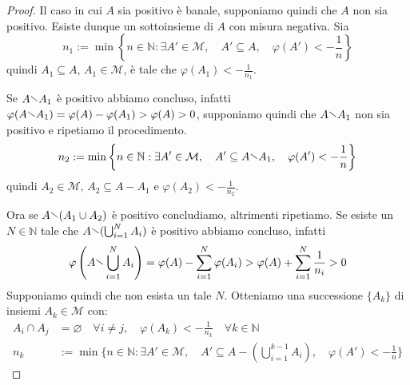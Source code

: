 \begin{proof}
    Il caso in cui \(A\) sia positivo è banale, supponiamo quindi che \(A\) non sia
    positivo. Esiste dunque un sottoinsieme di \(A\) con misura negativa. Sia
    \[
        n_{1} := \min \left\{n \in \mathbb{N} : \exists A' \in \mathcal{M}, \quad A'
        \subseteq A, \quad \varphi(A') < - \frac{1}{n} \right\} 
    \]
    quindi \(A_{1} \subseteq A \), \(A_{1} \in \mathcal{M}\), è tale
    che \(\varphi(A_{1}) < -\frac{1}{n_{1}}\).

    Se \(A\sminus A_{1}\) è positivo abbiamo concluso, infatti \(\varphi(A \sminus
    A_{1}) = \varphi(A) - \varphi(A_{1}) > \varphi(A)>0\), supponiamo quindi che
    \(A \sminus A_{1}\) non sia positivo e ripetiamo il procedimento.
    \[
        n_{2} := \min \left\{n \in \mathbb{N}: \exists A' \in \mathcal{M}, \quad A'
        \subseteq A \sminus A_{1}, \quad \varphi(A') < -\frac{1}{n} \right\} 
    \]
    quindi \(A_{2} \in \mathcal{M}\), \(A_{2} \subseteq A - A_{1} \) e
    \(\varphi(A_{2}) < -\frac{1}{n_{2}}\).

    Ora se \(A \sminus (A_{1} \cup A_{2})\) è positivo concludiamo, altrimenti
    ripetiamo.
    Se esiste un \(N \in \mathbb{N}\) tale che \(A \sminus (\bigcup_{i=1}^{N}
    A_{i} )\) è positivo abbiamo concluso, infatti
    \[
        \varphi\left(A \sminus \bigcup_{i=1}^{N} A_{i}\right) = \varphi(A) - \sum_{i=1}^{N}
        \varphi(A_{i}) > \varphi(A) + \sum_{i=1}^{N} \frac{1}{n_{i}} > 0
    \]
    Supponiamo quindi che non esista un tale \(N\). Otteniamo una successione
    \(\{A_k\} \) di insiemi \(A_k \in \mathcal{M}\) con:
    \begin{align*}
        A_{i} \cap A_{j} &= \varnothing \quad \forall i \neq j, \quad
        \varphi(A_k) < -\frac{1}{n_{k}} \quad \forall k \in \mathbb{N} \\
        n_k &:= \min \{n \in \mathbb{N}: \exists A' \in \mathcal{M}, \quad A'
        \subseteq A - \left( \bigcup_{i=1}^{k-1} A_{i}  \right), \quad
    \varphi(A') < -\frac{1}{n} \} 
    \end{align*}
    

\end{proof}
